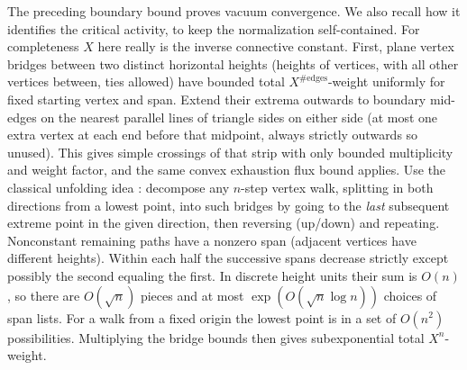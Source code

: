 \begin{remark}
The preceding boundary bound proves vacuum convergence. We also recall how it identifies the critical activity, to keep the normalization self-contained. For completeness \(X\) here really is the inverse connective constant. First, plane vertex bridges between two distinct horizontal heights (heights of vertices, with all other vertices between, ties allowed) have bounded total \(X^{\#\text{edges}}\)-weight uniformly for fixed starting vertex and span. Extend their extrema outwards to boundary mid-edges on the nearest parallel lines of triangle sides on either side (at most one extra vertex at each end before that midpoint, always strictly outwards so unused). This gives simple crossings of that strip with only bounded multiplicity and weight factor, and the same convex exhaustion flux bound applies. Use the classical unfolding idea \cite{HammersleyWelsh1962,MadrasSlade1993}: decompose any \(n\)-step vertex walk, splitting in both directions from a lowest point, into such bridges by going to the \emph{last} subsequent extreme point in the given direction, then reversing (up/down) and repeating. Nonconstant remaining paths have a nonzero span (adjacent vertices have different heights). Within each half the successive spans decrease strictly except possibly the second equaling the first. In discrete height units their sum is \(O(n)\), so there are \(O(\sqrt n)\) pieces and at most \(\exp(O(\sqrt n\log n))\) choices of span lists. For a walk from a fixed origin the lowest point is in a set of \(O(n^2)\) possibilities. Multiplying the bridge bounds then gives subexponential total \(X^n\)-weight.


\end{remark}
